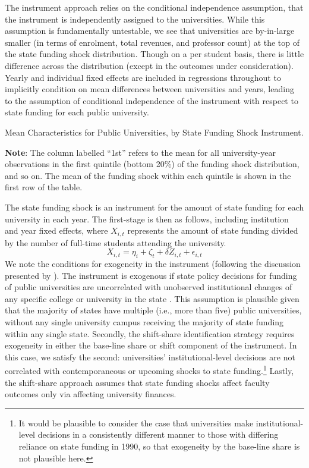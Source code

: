 The instrument approach relies on the conditional independence assumption, that the instrument is independently assigned to the universities.
While this assumption is fundamentally untestable, we see that universities are by-in-large smaller (in terms of enrolment, total revenues, and professor count) at the top of the state funding shock distribution.
Though on a per student basis, there is little difference across the distribution (except in the outcomes under consideration).
Yearly and individual fixed effects are included in regressions throughout to implicitly condition on mean differences between universities and years, leading to the assumption of conditional independence of the instrument with respect to state funding for each public university.

\begin{table}[h!]
    \singlespacing
    \centering
    \caption{Mean Characteristics for Public Universities, by State Funding Shock Instrument.}
    \makebox[\textwidth][c]{}
    \label{tab:summary-quantiles}
    \footnotesize
    \textbf{Note}:
    The column labelled ``1st'' refers to the mean for all university-year observations in the first quintile (bottom 20\%) of the funding shock distribution, and so on.
    The mean of the funding shock within each quintile is shown in the first row of the table.
\end{table}

The state funding shock is an instrument for the amount of state funding for each university in each year.  
The first-stage is then as follows, including institution and year fixed effects, where $X_{i,t}$ represents the amount of state funding divided by the number of full-time students attending the university.
\begin{equation}
    \label{eqn:firststage}
    X_{i,t} = \eta_i + \zeta_t + \delta Z_{i,t} + \epsilon_{i,t}
\end{equation}
We note the conditions for exogeneity in the instrument (following the discussion presented by \citealt{NBERw27885}).
The instrument is exogenous if state policy decisions for funding of public universities are uncorrelated with unobserved institutional changes of any specific college or university in the state \citep{borusyak2022quasi}.
This assumption is plausible given that the majority of states have multiple (i.e., more than five) public universities, without any single university campus receiving the majority of state funding within any single state.
Secondly, the shift-share identification strategy requires exogeneity in either the base-line share or shift component of the instrument.
In this case, we satisfy the second: universities' institutional-level decisions are not correlated with contemporaneous or upcoming shocks to state funding.\footnote{
    It would be plausible to consider the case that universities make institutional-level decisions in a consistently different manner to those 
    with differing reliance on state funding in 1990, so that exogeneity by the base-line share is not plausible here.
}
Lastly, the shift-share approach assumes that state funding shocks affect faculty outcomes only via affecting university finances.

